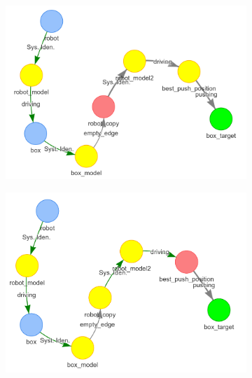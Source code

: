 \begin{figure}[H]
    \begin{subfigure}{.3\textwidth}
    \centering
    \includegraphics[width=1\textwidth]{figures/proposed_method/connecting_nodes/robot_push/robot_push_7}
    \caption{}\label{subfig:robot_push_7}
    \end{subfigure}
    \begin{subfigure}{.3\textwidth}
    \centering
    \includegraphics[width=1.05\textwidth]{figures/proposed_method/connecting_nodes/robot_push/robot_push_8}
    \caption{}\label{subfig:robot_push_8}
    \end{subfigure}
    \begin{subfigure}{.3\textwidth}
    \centering

\end{subfigure}
\end{figure}
